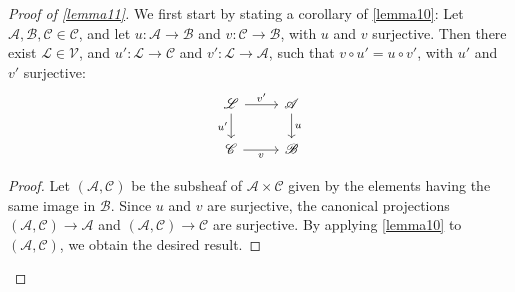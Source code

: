 \documentclass{article}
\theoremstyle{plain}
\newenvironment{lemma}[1]
    {\renewcommand\theinnercustomlemma{#1}\innercustomlemma}
    {\endinnercustomlemma}
\theoremstyle{definition}
\newcommand{\sh}{\mathscr}
\newcommand{\cat}{\mathcal}
\begin{document}
\begin{proof}[Proof of \cref{lemma11}]
  We first start by stating a corollary of \cref{lemma10}:
  \begin{lemma}{13}
  \label{lemma13}
    Let $\sh{A},\sh{B},\sh{C}\in\cat{C}$, and let $u\colon\sh{A}\to\sh{B}$ and $v\colon\sh{C}\to\sh{B}$, with $u$ and $v$ surjective.
    Then there exist $\sh{L}\in\cat{V}$, and $u'\colon\sh{L}\to\sh{C}$ and $v'\colon\sh{L}\to\sh{A}$, such that $v\circ u'=u\circ v'$, with $u'$ and $v'$ surjective:
    \[
      \begin{tikzcd}
        \sh{L} \ar[r,"v'"] \ar[d,swap,"u'"]
        & \sh{A} \ar[d,"u"]
      \\\sh{C} \ar[r,swap,"v"]
        & \sh{B}
      \end{tikzcd}
    \]
  \end{lemma}

  \begin{proof}
    Let $(\sh{A},\sh{C})$ be the subsheaf of $\sh{A}\times\sh{C}$ given by the elements having the same image in $\sh{B}$.
    Since $u$ and $v$ are surjective, the canonical projections $(\sh{A},\sh{C})\to\sh{A}$ and $(\sh{A},\sh{C})\to\sh{C}$ are surjective.
    By applying \cref{lemma10} to $(\sh{A},\sh{C})$, we obtain the desired result.
  \end{proof}


\end{proof}
\end{document}
